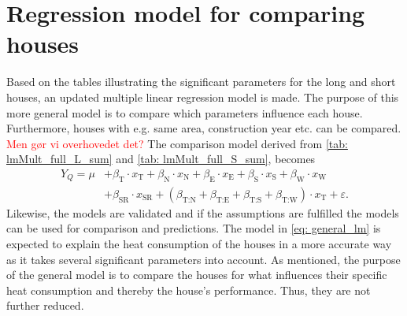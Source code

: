 \begin{table}
    \centering
\caption{The distribution of significant parameters from the multiple linear regression model for short houses. As for the long houses, the total of the signifance is in relation to the number of long houses}
\label{tab: lmMult_full_S_sum}
\end{table}



\section{Regression model for comparing houses}
Based on the tables illustrating the significant parameters for the long and short houses, an updated multiple linear regression model is made. The purpose of this more general model is to compare which parameters influence each house. Furthermore, houses with e.g. same area, construction year etc. can be compared. \textcolor{red}{Men gør vi overhovedet det?} The comparison model derived from \cref{tab: lmMult_full_L_sum} and \cref{tab: lmMult_full_S_sum}, becomes
\begin{align}
        Y_{Q} = \mu & + \beta_{\text{T}}\cdot x_{\text{T}} + \beta_{\text{N}}\cdot x_{\text{N}} + \beta_{\text{E}}\cdot x_{\text{E}}+ \beta_{\text{S}}\cdot x_{\text{S}} + \beta_{\text{W}}\cdot x_{\text{W}} \nonumber \\ & + \beta_{\text{SR}}\cdot x_{\text{SR}} + (\beta_{\text{T:N}} + \beta_{\text{T:E}} + \beta_{\text{T:S}} + \beta_{\text{T:W}}) \cdot x_{\text{T}} + \varepsilon. \label{eq: general_lm}
\end{align}
Likewise, the models are validated and if the assumptions are fulfilled the models can be used for comparison and predictions. The model in \cref{eq: general_lm} is expected to explain the heat consumption of the houses in a more accurate way as it takes several significant parameters into account. As mentioned, the purpose of the general model is to compare the houses for what influences their specific heat consumption and thereby the house's performance. Thus, they are not further reduced.

